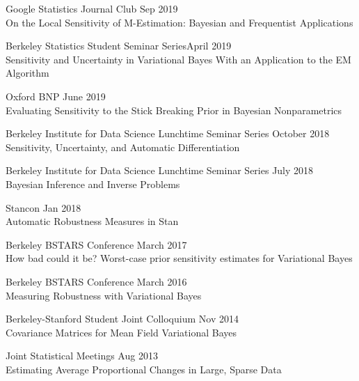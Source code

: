 \documentclass[margin,line]{res}
\begin{document}
\begin{resume}
Google Statistics Journal Club \hfill Sep 2019\\
On the Local Sensitivity of M-Estimation: Bayesian and Frequentist Applications

Berkeley Statistics Student Seminar Series\hfill April 2019\\
Sensitivity and Uncertainty in Variational Bayes With an Application to the
EM Algorithm


Oxford BNP \hfill June 2019\\
Evaluating Sensitivity to the Stick Breaking Prior in Bayesian Nonparametrics



Berkeley Institute for Data Science Lunchtime Seminar Series \hfill October 2018\\
Sensitivity, Uncertainty, and Automatic Differentiation

Berkeley Institute for Data Science Lunchtime Seminar Series \hfill July 2018\\
Bayesian Inference and Inverse Problems

Stancon \hfill Jan 2018\\
Automatic Robustness Measures in Stan


Berkeley BSTARS Conference \hfill March 2017\\
How bad could it be?  Worst-case prior sensitivity estimates for Variational Bayes

Berkeley BSTARS Conference \hfill March 2016\\
Measuring Robustness with Variational Bayes

Berkeley-Stanford Student Joint Colloquium \hfill Nov 2014\\
Covariance Matrices for Mean Field Variational Bayes

Joint Statistical Meetings \hfill Aug 2013\\
Estimating Average Proportional Changes in Large, Sparse Data



\end{resume}
\end{document}
